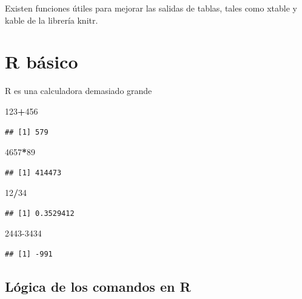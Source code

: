 \documentclass[
]{book}
\newenvironment{Shaded}{\begin{snugshade}}{\end{snugshade}}
\newcommand{\DecValTok}[1]{\textcolor[rgb]{0.00,0.00,0.81}{#1}}
\newcommand{\OperatorTok}[1]{\textcolor[rgb]{0.81,0.36,0.00}{\textbf{#1}}}
\begin{document}
Existen funciones útiles para mejorar las salidas de tablas, tales como xtable y kable de la librería knitr.

\hypertarget{r-buxe1sico}{%
\section{R básico}\label{r-buxe1sico}}

R es una calculadora demasiado grande

\begin{Shaded}
\begin{Highlighting}[]
\DecValTok{123}\OperatorTok{+}\DecValTok{456}
\end{Highlighting}
\end{Shaded}

\begin{verbatim}
## [1] 579
\end{verbatim}

\begin{Shaded}
\begin{Highlighting}[]
\DecValTok{4657}\OperatorTok{*}\DecValTok{89}
\end{Highlighting}
\end{Shaded}

\begin{verbatim}
## [1] 414473
\end{verbatim}

\begin{Shaded}
\begin{Highlighting}[]
\DecValTok{12}\OperatorTok{/}\DecValTok{34}
\end{Highlighting}
\end{Shaded}

\begin{verbatim}
## [1] 0.3529412
\end{verbatim}

\begin{Shaded}
\begin{Highlighting}[]
\DecValTok{2443-3434}
\end{Highlighting}
\end{Shaded}

\begin{verbatim}
## [1] -991
\end{verbatim}

\hypertarget{luxf3gica-de-los-comandos-en-r}{%
\subsection{Lógica de los comandos en R}\label{luxf3gica-de-los-comandos-en-r}}
\end{document}
